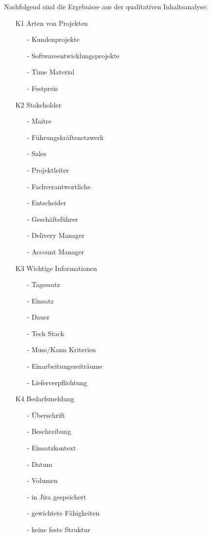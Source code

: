 Nachfolgend sind die Ergebnisse aus der qualitativen Inhaltsanalyse:
\begin{itemize}
	\item[K1] Arten von Projekten
	\begin{itemize}
		\item[-] Kundenprojekte
		\item[-] Softwareentwicklungsprojekte
		\item[-] Time Material
		\item[-] Festpreis
	\end{itemize}
	\item[K2] Stakeholder
	\begin{itemize}
		\item[-] Maitre
		\item[-] Führungskräftenetzwerk
		\item[-] Sales
		\item[-] Projektleiter
		\item[-] Fachverantwortliche
		\item[-] Entscheider
		\item[-] Geschäftsführer
		\item[-] Delivery Manager
		\item[-] Account Manager
	\end{itemize}
	\item[K3] Wichtige Informationen
	\begin{itemize}
		\item[-] Tagessatz
		\item[-] Einsatz
		\item[-] Dauer
		\item[-] Tech Stack
		\item[-] Muss/Kann Kriterien
		\item[-] Einarbeitungszeiträume
		\item[-] Lieferverpflichtung
	\end{itemize}
	\item[K4] Bedarfsmeldung
	\begin{itemize}
		\item[-] Überschrift
		\item[-] Beschreibung
		\item[-] Einsatzkontext
		\item[-] Datum
		\item[-] Volumen
		\item[-] in Jira gespeichert
		\item[-] gewichtete Fähigkeiten
		\item[-] keine feste Struktur

\end{itemize}
\end{itemize}
